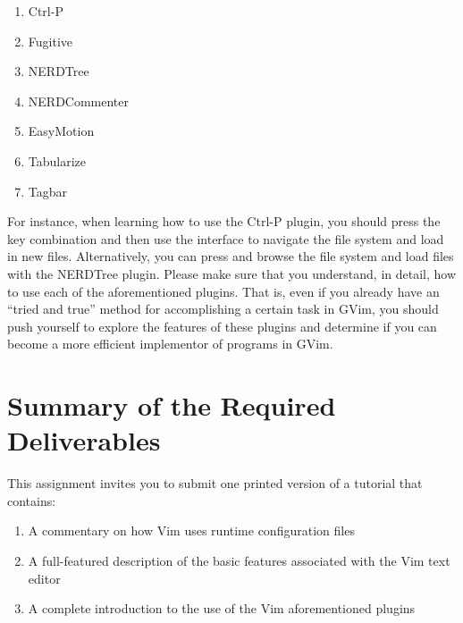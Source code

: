 \begin{enumerate}
  \itemsep 0em
  \item Ctrl-P
  \item Fugitive
  \item NERDTree
  \item NERDCommenter
  \item EasyMotion
  \item Tabularize
  \item Tagbar
\end{enumerate}

For instance, when learning how to use the Ctrl-P plugin, you should press the key combination {\tt <ctrl-p>} and then
use the interface to navigate the file system and load in new files.  Alternatively, you can press {\tt <ctrl-E>} and
browse the file system and load files with the NERDTree plugin. Please make sure that you understand, in detail, how to
use each of the aforementioned plugins.  That is, even if you already have an ``tried and true'' method for
accomplishing a certain task in GVim, you should push yourself to explore the features of these plugins and determine if
you can become a more efficient implementor of programs in GVim.

\section*{Summary of the Required Deliverables}

This assignment invites you to submit one printed version of a tutorial that contains:

\begin{enumerate}

  \item A commentary on how Vim uses runtime configuration files

  \item A full-featured description of the basic features associated with the Vim text editor

  \item A complete introduction to the use of the Vim aforementioned plugins

\end{enumerate}


